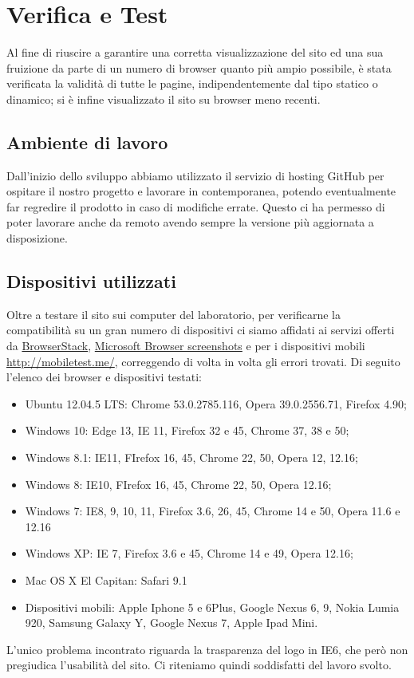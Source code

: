 \section{Verifica e Test}{
	Al fine di riuscire a garantire una corretta visualizzazione del sito ed una sua fruizione da parte di un numero di browser quanto più ampio possibile, è stata verificata la validità di tutte le pagine, indipendentemente dal tipo statico o dinamico; si è infine visualizzato il sito su browser meno recenti.
	\subsection{Ambiente di lavoro}{
		Dall'inizio dello sviluppo abbiamo utilizzato il servizio di hosting GitHub per ospitare il nostro progetto e lavorare in contemporanea, potendo eventualmente far regredire il prodotto in caso di modifiche errate. Questo ci ha permesso di poter lavorare anche da remoto avendo sempre la versione più aggiornata a disposizione.
	}
	\subsection{Dispositivi utilizzati}{
		Oltre a testare il sito sui computer del laboratorio, per verificarne la compatibilità su un gran numero di dispositivi ci siamo affidati ai servizi offerti da \href{https://www.browserstack.com/screenshots}{BrowserStack}, \href{https://developer.microsoft.com/en-us/microsoft-edge/tools/screenshots/}{Microsoft Browser screenshots} e per i dispositivi mobili \url{http://mobiletest.me/}, correggendo di volta in volta gli errori trovati.  Di seguito l'elenco dei browser e dispositivi testati:
		\begin{itemize}\itemsep1pt
			\item Ubuntu 12.04.5 LTS: Chrome 53.0.2785.116, Opera 39.0.2556.71, Firefox 4.90;
			\item Windows 10: Edge 13, IE 11, Firefox 32 e 45, Chrome 37, 38 e 50;
			\item Windows 8.1: IE11, FIrefox 16, 45, Chrome 22, 50, Opera 12, 12.16;
			\item Windows 8: IE10, FIrefox 16, 45, Chrome 22, 50, Opera 12.16;
			\item Windows 7: IE8, 9, 10, 11, Firefox 3.6, 26, 45, Chrome 14 e 50, Opera 11.6 e 12.16
			\item Windows XP: IE 7, Firefox 3.6 e 45, Chrome 14 e 49, Opera 12.16;
			\item Mac OS X El Capitan: Safari 9.1
			\item Dispositivi mobili: Apple Iphone 5 e 6Plus, Google Nexus 6, 9, Nokia Lumia 920, Samsung Galaxy Y, Google Nexus 7, Apple Ipad Mini.
		\end{itemize}
		L'unico problema incontrato riguarda la trasparenza del logo in IE6, che però non pregiudica l'usabilità del sito. Ci riteniamo quindi soddisfatti del lavoro svolto.
	}
}
